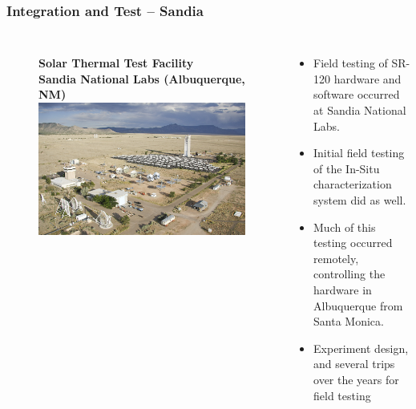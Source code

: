 \documentclass[aspectratio=169]{beamer}
\begin{document}
\begin{frame}
  \frametitle{Integration and Test -- Sandia}
  \begin{columns}[c]
    \begin{figure}
      \textbf{Solar Thermal Test Facility\\Sandia National Labs
        (Albuquerque, NM)}
      \includegraphics[width=\linewidth]{Sandia.png}
    \end{figure}

    \begin{itemize}
    \item Field testing of SR-120 hardware and software occurred at
      Sandia National Labs.
    \item Initial field testing of the In-Situ characterization system did as well.
    \item Much of this testing occurred remotely, controlling the hardware in Albuquerque from Santa Monica.
    \item Experiment design, and several trips over the years for field testing
    \end{itemize}
  \end{columns}
\end{frame}
\end{document}

